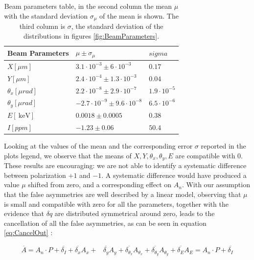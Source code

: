 \begin{table}[hbtp]
\centering

\begin{tabular}{l|l|l}
\hline 
Beam Parameters & $\mu \pm \sigma_{\mu}$  & $sigma$ \\ 
\hline 
$X [\mu m]$ & $3.1 \cdot 10^{-3} \pm 6\cdot 10^{-3}$ & $0.17$ \\ 
$Y[\mu m]$ & $2.4 \cdot 10^{-4} \pm 1.3\cdot 10^{-3}$  & $0.04$ \\ 
$\theta_{x} [\mu rad]$ & $2.2 \cdot 10^{-8} \pm 2.9\cdot 10^{-7}$ & $ 1.9 \cdot 10^{-5} $ \\ 
$ \theta_{y} [\mu rad]$ & $-2.7 \cdot 10^{-9} \pm 9.6\cdot 10^{-8}$ & $6.5 \cdot 10^{-6}$ \\ 
$E [\SI{}{\kilo \electronvolt}]$ & $0.0018 \pm 0.0005$ & $0.38$ \\
$I [ppm] $ & $-1.23 \pm 0.06$ & $50.4$ \\ 
\hline 
\end{tabular} 
\caption{Beam parameters table, in the second column the mean $\mu$ with the standard deviation $\sigma_{\mu}$ of the mean is shown. The third column is $\sigma$, the standard deviation of the distributions in figures \ref{fig:BeamParameters}.}
\label{Tab:parametri} 
\end{table}

Looking at the values of the mean and the corresponding error $\sigma$ reported in the plots legend, we observe that the means of $X,Y,\theta_{x},\theta_{y},E$ are compatible with $0$. These results are encouraging: we are not able to identify a systematic difference between polarization $+1$ and $-1$. A systematic difference would have produced a value $\mu$ shifted from zero, and a corresponding effect on $A_{n}$. 
With our assumption that the false asymmetries are well described by a linear model, observing that $\mu$ is small and compatible with zero for all the parameters, together with the evidence that $\delta q$ are distributed symmetrical around zero, leads to the cancellation of all the false asymmetries, as can be seen in equation \ref{eq:CancelOut} :

\begin{align} \label{eq:CancelOut}
\overline{A} = A_{n} \cdot P + \overline{\delta_{I}} + \overline{\delta_{x}}A_{x} + & \overline{\delta_{y}} A_{y} + \overline{\delta_{\theta_{x}}} A_{\theta_{x}} + \overline{\delta_{\theta_{y}}} A_{\theta_{y}} + \overline{\delta_{E}}A_{E} = A_{n} \cdot P + \overline{\delta_{I}}
\end{align}  

